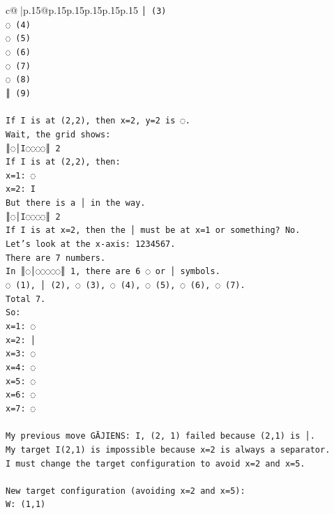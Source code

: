 \documentclass{article}
\begin{document}
{\begin{supertabular}{c@{$\;$}|p{.15\linewidth}@{}p{.15\linewidth}p{.15\linewidth}p{.15\linewidth}p{.15\linewidth}p{.15\linewidth}}
{{{\texttt{│ (3)} \\
\texttt{◌ (4)} \\
\texttt{◌ (5)} \\
\texttt{◌ (6)} \\
\texttt{◌ (7)} \\
\texttt{◌ (8)} \\
\texttt{║ (9)} \\
\\ 
\texttt{If I is at (2,2), then x=2, y=2 is ◌.} \\
\texttt{Wait, the grid shows:} \\
\texttt{║◌│I◌◌◌◌║ 2} \\
\texttt{If I is at (2,2), then:} \\
\texttt{x=1: ◌} \\
\texttt{x=2: I} \\
\texttt{But there is a │ in the way.} \\
\texttt{║◌│I◌◌◌◌║ 2} \\
\texttt{If I is at x=2, then the │ must be at x=1 or something? No.} \\
\texttt{Let's look at the x{-}axis: 1234567.} \\
\texttt{There are 7 numbers.} \\
\texttt{In ║◌│◌◌◌◌◌║ 1, there are 6 ◌ or │ symbols.} \\
\texttt{◌ (1), │ (2), ◌ (3), ◌ (4), ◌ (5), ◌ (6), ◌ (7).} \\
\texttt{Total 7.} \\
\texttt{So:} \\
\texttt{x=1: ◌} \\
\texttt{x=2: │} \\
\texttt{x=3: ◌} \\
\texttt{x=4: ◌} \\
\texttt{x=5: ◌} \\
\texttt{x=6: ◌} \\
\texttt{x=7: ◌} \\
\\ 
\texttt{My previous move GĀJIENS: I, (2, 1) failed because (2,1) is │.} \\
\texttt{My target I(2,1) is impossible because x=2 is always a separator.} \\
\texttt{I must change the target configuration to avoid x=2 and x=5.} \\
\\ 
\texttt{New target configuration (avoiding x=2 and x=5):} \\
\texttt{W: (1,1)} \\
}}}
\end{supertabular}}
\end{document}
